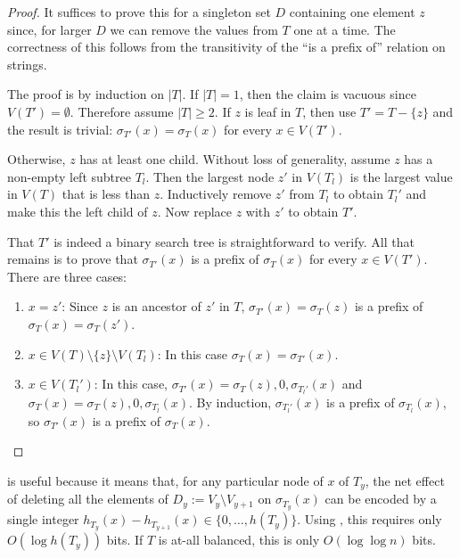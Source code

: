 \documentclass[kpfonts]{patmorin}
\begin{document}
\begin{proof}
  It suffices to prove this for a singleton set $D$ containing one element $z$ since, for larger $D$ we can remove the values from $T$ one at a time.  The correctness of this follows from the transitivity of the ``is a prefix of'' relation on strings.
  
  The proof is by induction on $|T|$. If $|T|=1$, then the claim is vacuous since $V(T')=\emptyset$.  Therefore assume $|T|\ge 2$.  If $z$ is leaf in $T$, then use $T'=T-\{z\}$ and the result is trivial: $\sigma_{T'}(x)=\sigma_T(x)$ for every $x\in V(T')$.  
  
  Otherwise, $z$ has at least one child.  Without loss of generality, assume $z$ has a non-empty left subtree $T_l$.  Then the largest node $z'$ in $V(T_l)$ is the largest value in $V(T)$ that is less than $z$. Inductively remove $z'$ from $T_l$ to obtain $T_l'$ and make this the left child of $z$.  Now replace $z$ with $z'$ to obtain $T'$.  
  
  That $T'$ is indeed a binary search tree is straightforward to verify.  All that remains is to prove that $\sigma_{T'}(x)$ is a prefix of $\sigma_T(x)$ for every $x\in V(T')$. There are three cases:
  \begin{enumerate}
    \item $x=z'$: Since $z$ is an ancestor of $z'$ in $T$, $\sigma_{T'}(x)=\sigma_T(z)$ is a prefix of $\sigma_T(x)=\sigma_T(z')$.  
    
    \item $x\in V(T)\setminus\{z\}\setminus V(T_l)$: In this case $\sigma_T(x)=\sigma_{T'}(x)$.  
    
    \item $x\in V(T_l')$: In this case, $\sigma_{T'}(x)=\sigma_{T}(z),0,\sigma_{T_l'}(x)$ and $\sigma_T(x)=\sigma_{T}(z),0,\sigma_{T_l}(x)$.  By induction, $\sigma_{T_l'}(x)$ is a prefix of $\sigma_{T_l}(x)$, so $\sigma_{T'}(x)$ is a prefix of $\sigma_T(x)$. \qedhere
  \end{enumerate}
\end{proof}

 is useful because it means that, for any particular node of $x$ of $T_y$, the net effect of deleting all the elements of $D_y:=V_{y}\setminus V_{y+1}$ on $\sigma_{T_y}(x)$ can be encoded by a single integer $h_{T_y}(x)-h_{T_{y+1}}(x)\in\{0,\ldots,h(T_y)\}$.  Using , this requires only $O(\log h(T_y))$ bits.  If $T$ is at-all balanced, this is only $O(\log\log n)$ bits.
\end{document}

